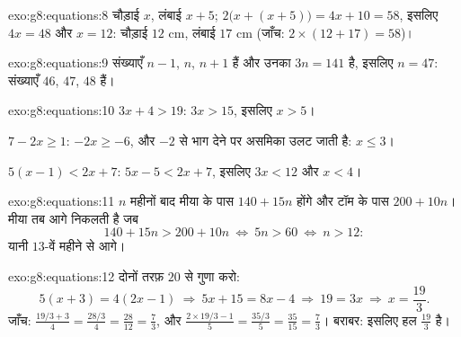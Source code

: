 \begin{solution}{exo:g8:equations:8}
चौड़ाई $x$, लंबाई $x + 5$; 
$2\bigl(x + (x + 5)\bigr) = 4x + 10 = 58$, इसलिए $4x = 48$ और
$x = 12$: चौड़ाई $12$ cm, लंबाई $17$ cm (जाँच:
$2 \times (12 + 17) = 58$)।
\end{solution}

\begin{solution}{exo:g8:equations:9}
संख्याएँ $n - 1$, $n$, $n + 1$ हैं और उनका  $3n = 141$ है,
इसलिए $n = 47$: संख्याएँ $46$, $47$, $48$ हैं।
\end{solution}

\begin{solution}{exo:g8:equations:10}
$3x + 4 > 19$: $3x > 15$, इसलिए $x > 5$।

$7 - 2x \geq 1$: $-2x \geq -6$, और $-2$ से भाग देने पर असमिका उलट
जाती है: $x \leq 3$।

$5(x-1) < 2x + 7$: $5x - 5 < 2x + 7$, इसलिए $3x < 12$ और $x < 4$।
\end{solution}

\begin{solution}{exo:g8:equations:11}
$n$ महीनों बाद मीया के पास $140 + 15n$ होंगे और टॉम के पास
$200 + 10n$। मीया तब आगे निकलती है जब
\[
140 + 15n > 200 + 10n
\ \Longleftrightarrow\
5n > 60
\ \Longleftrightarrow\
n > 12 :
\]
यानी $13$-वें महीने से आगे।
\end{solution}

\begin{solution}{exo:g8:equations:12}
दोनों तरफ़ $20$ से गुणा करो:
\[
5(x + 3) = 4(2x - 1)
\ \Longrightarrow\
5x + 15 = 8x - 4
\ \Longrightarrow\
19 = 3x
\ \Longrightarrow\
x = \frac{19}{3}.
\]
जाँच: $\frac{19/3 + 3}{4} = \frac{28/3}{4} = \frac{28}{12} =
\frac73$, और $\frac{2 \times 19/3 - 1}{5} = \frac{35/3}{5} =
\frac{35}{15} = \frac73$। बराबर: इसलिए हल $\frac{19}{3}$ है।
\end{solution}

